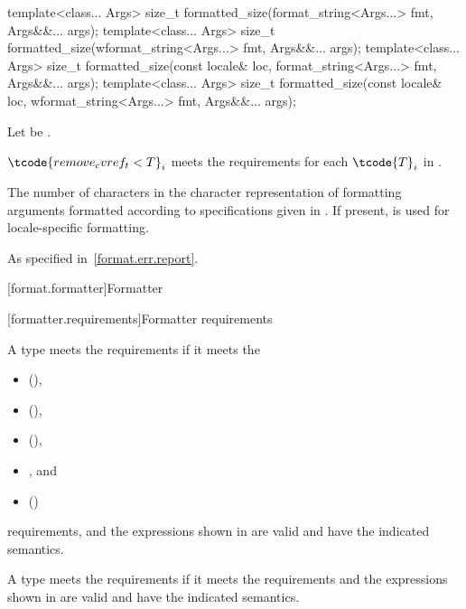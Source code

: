 %
\begin{itemdecl}
template<class... Args>
  size_t formatted_size(format_string<Args...> fmt, Args&&... args);
template<class... Args>
  size_t formatted_size(wformat_string<Args...> fmt, Args&&... args);
template<class... Args>
  size_t formatted_size(const locale& loc, format_string<Args...> fmt, Args&&... args);
template<class... Args>
  size_t formatted_size(const locale& loc, wformat_string<Args...> fmt, Args&&... args);
\end{itemdecl}

\begin{itemdescr}
\pnum
Let  be .

\pnum
\expects
{}$\tcode{remove_cvref_t<T}_i$
meets the  requirements
for each $\tcode{T}_i$ in .

\pnum
\returns
The number of characters in the character representation of
formatting arguments 
formatted according to specifications given in .
If present,  is used for locale-specific formatting.

\pnum
\throws
As specified in~\ref{format.err.report}.
\end{itemdescr}

[format.formatter]{Formatter}

[formatter.requirements]{Formatter requirements}

\pnum
A type  meets the  requirements if
it meets the
\begin{itemize}
\item {} (),
\item {} (),
\item {} (),
\item {}, and
\item {} ()
\end{itemize}
requirements, and
the expressions shown in  are valid and
have the indicated semantics.

\pnum
A type  meets the  requirements
if it meets the  requirements and
the expressions shown in  are valid and
have the indicated semantics.

